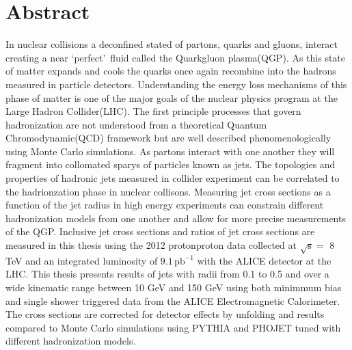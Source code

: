 \chapter*{Abstract}\label{ch:abstract}
In nuclear collisions a deconfined stated of partons, quarks and gluons, interact creating a near \lq perfect\rq \, fluid called the Quark\textendash gluon plasma(QGP).  As this state of matter expands and cools the quarks once again recombine into the hadrons measured in particle detectors.  Understanding the energy loss mechanisms of this phase of matter is one of the major goals of the nuclear physics program at the Large Hadron Collider(LHC).  The first principle processes that govern hadronization are not understood from a theoretical Quantum Chromodynamic(QCD) framework but are well described phenomenologically using Monte Carlo simulations.  
As partons interact with one another they will fragment into collomated sparys of particles known as jets.  The topologies and properties of hadronic jets measured in collider experiment can be correlated to the hadrionzation phase in nuclear collisons.   Measuring  jet cross sections as a function of the jet radius in high energy experiments can constrain different hadronization models from one another and allow for more precise measurements of the QGP.
Inclusive jet cross sections and ratios of jet cross sections are measured in this thesis using the 2012 proton\textendash proton data collected at $ \sqrt{ \mathrm{s} } = $ 8 TeV and an integrated luminosity of $ 9.1 \,\mathrm{pb^{-1}} $  with the ALICE detector at the LHC.  This thesis presents results of jets with radii from 0.1 to 0.5 and over a wide kinematic range between 10 GeV and 150 GeV using both minimmum bias and single shower triggered data from the ALICE Electromagnetic Calorimeter.  The cross sections are corrected for detector effects by unfolding and results compared to Monte Carlo simulations using PYTHIA and PHOJET tuned with different hadronization models.  